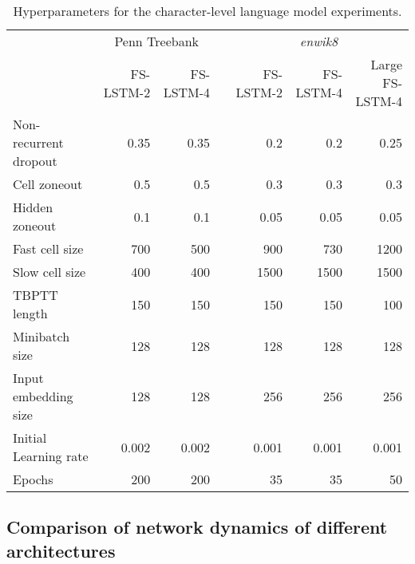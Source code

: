 \documentclass{article}
\begin{document}
\begin{table}
\caption{Hyperparameters for the character-level language model experiments.}
\label{table: params}
\renewcommand{\arraystretch}{1.1}
\begin{center}
 \begin{tabular}{@{} lrrrrrr @{}} 
 \toprule[1.5pt]
  &  \multicolumn{2}{c}{Penn Treebank}    &  & \multicolumn{3}{c}{\emph{enwik8}} \\ 
  \cmidrule{2-3} \cmidrule{5-7}
  & \small{FS-LSTM-2} & \small{FS-LSTM-4} & & \small{FS-LSTM-2} & \small{FS-LSTM-4} & \makecell[c]{Large \\ \small{FS-LSTM-4}}\\ 

 \midrule
 Non-recurrent dropout & 0.35 & 0.35 & & 0.2 & 0.2 & 0.25\\
Cell zoneout & 0.5 & 0.5 & & 0.3 & 0.3 & 0.3\\
Hidden zoneout & 0.1 & 0.1 & & 0.05 & 0.05 & 0.05\\
 \midrule
 Fast cell size & 700 & 500 & & 900 & 730 & 1200 \\
 Slow cell size & 400 & 400 & & 1500 & 1500 & 1500 \\  
 \midrule
 TBPTT length & 150 & 150 & & 150 & 150 & 100\\
 Minibatch size & 128 & 128 & & 128 & 128 & 128\\
 Input embedding size & 128 & 128 & & 256 & 256 & 256\\
 Initial Learning rate & 0.002 & 0.002 & & 0.001 & 0.001 & 0.001\\
 Epochs & 200 & 200 & & 35 & 35 & 50\\
 \bottomrule[1.5pt]
 

\end{tabular}

\end{center}
\end{table}





\subsection{Comparison of network dynamics of different architectures} \label{sec:experiments-comparison}
\end{document}
